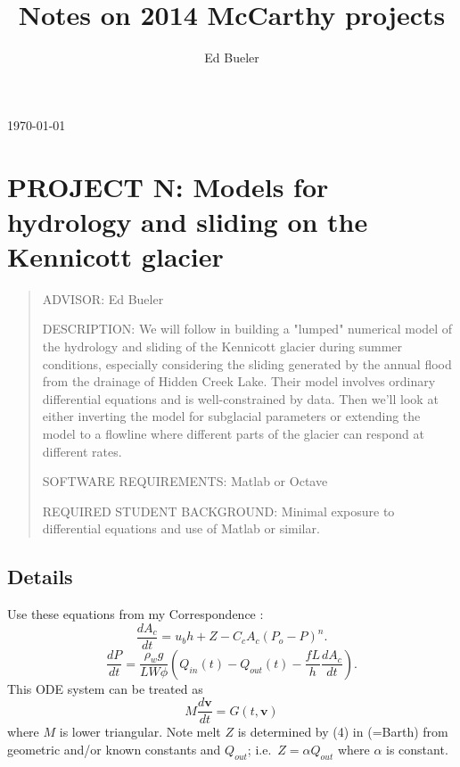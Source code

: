 \documentclass[11pt,final]{amsart}%
\title[]{Notes on 2014 McCarthy projects}
\author[]{Ed Bueler}
\newcommand\bv{\mathbf{v}}
\begin{document}

\scriptsize \hfill \today \normalsize
\vspace{0.5in}

\maketitle
\thispagestyle{empty}

\setcounter{equation}{19}

\section*{PROJECT N: Models for hydrology and sliding on the Kennicott glacier}

\begin{quote}
\noindent ADVISOR: Ed Bueler

\medskip
\noindent DESCRIPTION: We will follow \cite{Bartholomausetal2011} in building a "lumped" numerical model of the hydrology and sliding of the Kennicott glacier during summer conditions, especially considering the sliding generated by the annual flood from the drainage of Hidden Creek Lake.  Their model involves ordinary differential equations and is well-constrained by data.  Then we'll look at either inverting the model for subglacial parameters or extending the model to a flowline where different parts of the glacier can respond at different rates.

\medskip
\noindent SOFTWARE REQUIREMENTS: Matlab or Octave

\medskip
\noindent REQUIRED STUDENT BACKGROUND: Minimal exposure to differential equations and use of Matlab or similar.
\end{quote}

\subsection*{Details} Use these equations from my Correspondence \citep{Bueler2014correspondence}:
\begin{equation}
\frac{dA_c}{dt} = u_b h + Z - C_c A_c (P_o-P)^n.  \label{eq:barth:cavityevolution}
\end{equation}
\begin{equation}
\frac{dP}{dt} = \frac{\rho_w g}{L W \phi} \left(Q_{in}(t) - Q_{out}(t) - \frac{f L }{h} \frac{d A_c}{dt}\right).
\end{equation}
This ODE system can be treated as
\begin{equation}
M \frac{d\bv}{dt} = G(t,\bv) \label{eq:system}
\end{equation}
where $M$ is lower triangular.  Note melt $Z$ is determined by (4) in \cite{Bartholomausetal2011} (=Barth) from geometric and/or known constants and $Q_{out}$; i.e.~$Z=\alpha Q_{out}$ where $\alpha$ is constant.
\end{document}
